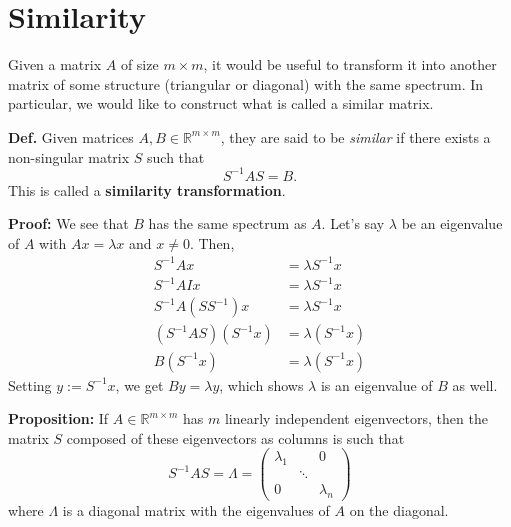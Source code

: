\section{Similarity}

Given a matrix \( A \) of size  $m \times m$, it would be useful to transform it into
another matrix of some structure (triangular or diagonal) with the same spectrum.
In particular, we would like to construct what is called a similar matrix.


\textbf{Def.} Given matrices \( A, B \in \mathbb{R}^{m \times m} \), they are said to be \textit{similar} if there exists a non-singular matrix \( S \) such that
\[
S^{-1}AS = B.
\]
This is called a \textbf{similarity transformation}.


\textbf{Proof:} We see that \( B \) has the same spectrum as \( A \). 
Let's say \( \lambda \) be an eigenvalue of \( A \) with \( Ax = \lambda x \) and \( x \neq 0 \). Then,
\begin{align*}
    S^{-1}Ax &= \lambda S^{-1}x \\
    S^{-1}AIx &= \lambda S^{-1}x \\
    S^{-1}A(SS^{-1})x &= \lambda S^{-1}x \\
    (S^{-1}AS)(S^{-1}x) & = \lambda (S^{-1}x) \\
    B(S^{-1}x) & = \lambda (S^{-1}x)
\end{align*}
Setting \( y := S^{-1}x \), we get $By = \lambda y$, which shows \( \lambda \) is an eigenvalue of \( B \) as well.


\textbf{Proposition:} If \( A \in \mathbb{R}^{m \times m} \) has \( m \) linearly independent eigenvectors, then the matrix \( S \) composed of these eigenvectors as columns is such that
\[
S^{-1}AS = \Lambda = \begin{pmatrix}
    \lambda_1 &  & 0 \\
     & \ddots &  \\
    0 &  & \lambda_n
    \end{pmatrix}
\]
where \( \Lambda \) is a diagonal matrix with the eigenvalues of \( A \) on the diagonal.

